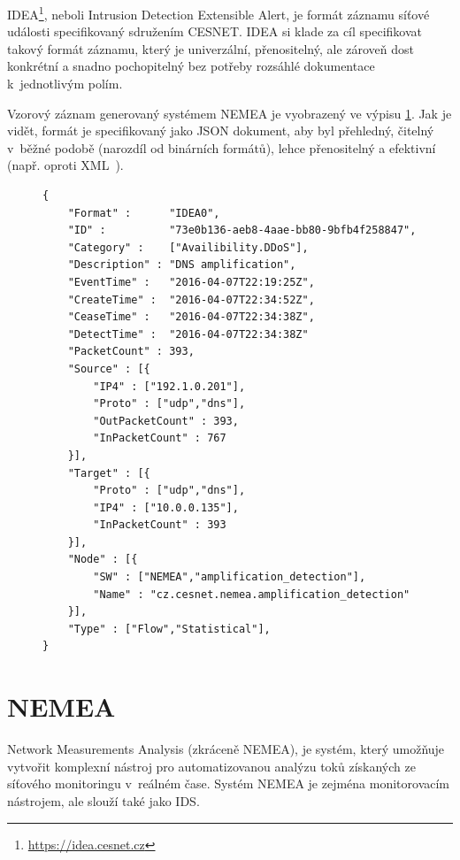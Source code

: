IDEA\footnote{\url{https://idea.cesnet.cz}}, neboli Intrusion Detection Extensible Alert, je formát záznamu síťové události specifikovaný sdružením CESNET. IDEA si klade za cíl specifikovat takový formát záznamu, který je univerzální, přenositelný, ale zároveň dost konkrétní a snadno pochopitelný bez potřeby rozsáhlé dokumentace k~jednotlivým polím.

Vzorový záznam generovaný systémem NEMEA je vyobrazený ve výpisu \ref{code:idea}. Jak je vidět, formát je specifikovaný jako JSON dokument, aby byl přehledný, čitelný v~běžné podobě (narozdíl od binárních formátů), lehce přenositelný a efektivní (např. oproti XML~\cite{xmlvsjson}).

\begin{figure}[ht]
\lstset{basicstyle=\small,style=JSON}
\begin{lstlisting}
{
    "Format" :      "IDEA0",
    "ID" :          "73e0b136-aeb8-4aae-bb80-9bfb4f258847",
    "Category" :    ["Availibility.DDoS"],
    "Description" : "DNS amplification",
    "EventTime" :   "2016-04-07T22:19:25Z",
    "CreateTime" :  "2016-04-07T22:34:52Z",
    "CeaseTime" :   "2016-04-07T22:34:38Z",
    "DetectTime" :  "2016-04-07T22:34:38Z"
    "PacketCount" : 393,
    "Source" : [{
        "IP4" : ["192.1.0.201"],
        "Proto" : ["udp","dns"],
        "OutPacketCount" : 393,
        "InPacketCount" : 767
    }],
    "Target" : [{
        "Proto" : ["udp","dns"],
        "IP4" : ["10.0.0.135"],
        "InPacketCount" : 393
    }],
    "Node" : [{
        "SW" : ["NEMEA","amplification_detection"],
        "Name" : "cz.cesnet.nemea.amplification_detection"
    }],
    "Type" : ["Flow","Statistical"],
}
\end{lstlisting}
\label{code:idea}
\end{figure}

\newpage

\section{NEMEA}

Network Measurements Analysis (zkráceně NEMEA), je systém, který umožňuje vytvořit komplexní nástroj pro automatizovanou analýzu toků získaných ze síťového monitoringu v~reálném čase. Systém NEMEA je zejména monitorovacím nástrojem, ale slouží také jako IDS.

